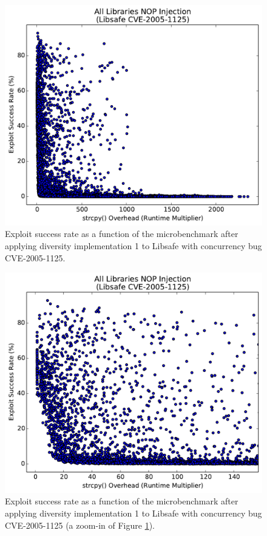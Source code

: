 \documentclass[letterpaper,twocolumn,10pt]{article}
\begin{document}
\begin{figure}
\centering
\includegraphics[width=\columnwidth]{figures/libsafe-all}
\caption{Exploit success rate as a function of the microbenchmark after applying diversity implementation 1 to Libsafe with concurrency bug CVE-2005-1125.}
\label{fig_libsafe-all}
\end{figure}

\begin{figure}
\centering
\includegraphics[width=\columnwidth]{figures/libsafe-all-zoom}
\caption{Exploit success rate as a function of the microbenchmark after applying diversity implementation 1 to Libsafe with concurrency bug CVE-2005-1125 (a zoom-in of Figure \ref{fig_libsafe-all}).}
\label{fig_libsafe-all-zoom}
\end{figure}
\end{document}
